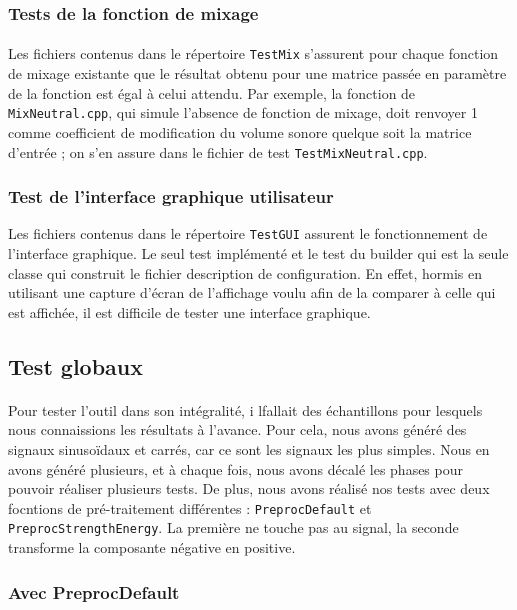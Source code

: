 \subsubsection{Tests de la fonction de mixage}
\paragraph{}
Les fichiers contenus dans le répertoire \verb!TestMix! s'assurent
pour chaque fonction de mixage existante que le résultat obtenu pour
une matrice passée en paramètre de la fonction est égal à celui
attendu. Par exemple, la fonction de \verb!MixNeutral.cpp!, qui simule
l'absence de fonction de mixage, doit renvoyer 1 comme coefficient de
modification du volume sonore quelque soit la matrice d'entrée ; on
s'en assure dans le fichier de test \verb!TestMixNeutral.cpp!.

\subsubsection{Test de l'interface graphique utilisateur}
Les fichiers contenus dans le répertoire \verb!TestGUI! assurent
le fonctionnement de l'interface graphique. Le seul test implémenté
et le test du builder qui est la seule classe qui construit le fichier description
de configuration.
En effet, hormis en utilisant une capture d'écran de l'affichage voulu afin
de la comparer à celle qui est affichée, il est difficile de tester
une interface graphique.

\subsection{Test globaux}
\paragraph{}
Pour tester l'outil dans son intégralité, i lfallait des échantillons pour lesquels nous connaissions les résultats à l'avance. Pour cela, nous avons généré des signaux sinusoïdaux et carrés, car ce sont les signaux les plus simples. Nous en avons généré plusieurs, et à chaque fois, nous avons décalé les phases pour pouvoir réaliser plusieurs tests. De plus, nous avons réalisé nos tests avec deux focntions de pré-traitement différentes : \verb!PreprocDefault! et \verb!PreprocStrengthEnergy!. La première ne touche pas au signal, la seconde transforme la composante négative en positive.
\subsubsection{Avec PreprocDefault}
